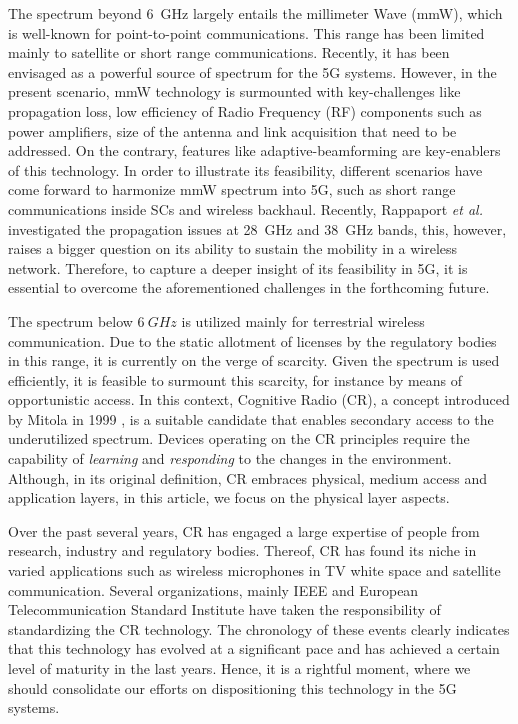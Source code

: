 \documentclass[draftcls, onecolumn, 11pt]{IEEEtran}
\begin{document}
The spectrum beyond \SI{6}{GHz} largely entails the millimeter Wave (mmW), which is well-known for point-to-point communications. This range has been limited mainly to satellite or short range communications. Recently, it has been envisaged as a powerful source of spectrum for the 5G systems. However, in the present scenario, mmW technology is surmounted with key-challenges like propagation loss, low efficiency of Radio Frequency (RF) components such as power amplifiers, size of the antenna and link acquisition
that need to be addressed. On the contrary, features like adaptive-beamforming are key-enablers of this technology. %
In order to illustrate its feasibility, different scenarios have come forward to harmonize mmW spectrum into 5G, such as short range communications inside SCs and wireless backhaul. 
Recently, Rappaport \textit{et al.} \cite{Rapp13} investigated the propagation issues at \SI{28}{GHz} and \SI{38}{GHz} bands, this, however, raises a bigger question on its ability to sustain the mobility in a wireless network. 
Therefore, to capture a deeper insight of its feasibility in 5G, it is essential to overcome the aforementioned challenges in the forthcoming future. 


The spectrum below $\SI{6}{GHz}$ is utilized mainly for terrestrial wireless communication. Due to the static allotment of licenses by the regulatory bodies in this range, it is currently on the verge of scarcity. Given the spectrum is used efficiently, it is feasible to surmount this scarcity, for instance by means of opportunistic access. In this context, Cognitive Radio (CR), a concept introduced by Mitola in 1999 \cite{Mitola99}, is a suitable candidate that enables secondary access to the underutilized spectrum. Devices operating on the CR principles require the capability of \textit{learning} and \textit{responding} to the changes in the environment. Although, in its original definition, CR embraces physical, medium access and application layers, in this article, we focus on the physical layer aspects. 

Over the past several years, CR has engaged a large expertise of people from research, industry and regulatory bodies. Thereof, CR has found its niche in varied applications such as wireless microphones in TV white space and satellite communication. Several organizations, mainly IEEE and European Telecommunication Standard Institute \cite{ETSI13} have taken the responsibility of standardizing the CR technology. The chronology of these events clearly indicates that this technology has evolved at a significant pace and has achieved a certain level of maturity in the last years. Hence, it is a rightful moment, where we should consolidate our efforts on dispositioning this technology in the 5G systems. 
\end{document}
